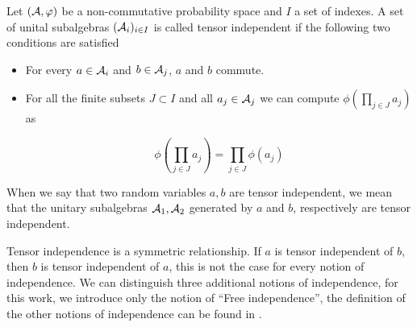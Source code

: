     \begin{definition}
        Let $(\mathcal A, \varphi)$ be a non-commutative probability space and $I$ a set of indexes. A set of unital subalgebras $(\mathcal A_{i})_{i\in I}$ is called tensor independent if the following two conditions are satisfied

        \begin{itemize}
            \item For every $a\in \mathcal A_i$ and $b\in \mathcal A_j$, $a$ and $b$ commute.
            \item For all the finite subsets $J\subset I$ and all $a_j \in \mathcal A_j$ we can compute $\phi\left( \prod_{j\in J} a_j \right)$ as
            
            \begin{equation*}
                \phi\left( \prod_{j\in J} a_j \right) = \prod_{j\in J}  \phi\left( a_j \right)
            \end{equation*}
        \end{itemize}

        When we say that two random variables $a,b$ are tensor independent, we mean that the unitary subalgebras $\mathcal A_1, \mathcal A_2$ generated by $a$ and $b$, respectively are tensor independent.
    \end{definition}

    Tensor independence is a symmetric relationship. If $a$ is tensor independent of $b$, then $b$ is tensor independent of $a$, this is not the case for every notion of independence. We can distinguish three additional notions of independence, for this work, we introduce only the notion of ``Free independence'', the definition of the other notions of independence can be found in \cite{anaya2016cumulantes}.





